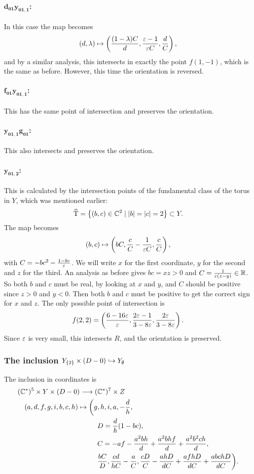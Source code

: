 \paragraph{$\mathbf{d_{01} y_{01,1}}$:}
In this case the map becomes
\[ (d,\lambda) \mapsto \left( \frac{(1-\lambda)C}{d},\frac{\varepsilon-1}{\varepsilon C},
  \frac{d}{C} \right), \]
and by a similar analysis, this intersects in exactly the
point $f(1,-1)$, which is the same as before. However, this time the
orientation is reversed.

\paragraph{$\mathbf{f_{01} y_{01,1}}$:}
This has the same point of intersection and preserves the orientation.

\paragraph{$\mathbf{y_{01,1}g_{01}}$:}
This also intersects and preserves the orientation.

\paragraph{$\mathbf{y_{01,2}}$:}
This is calculated by the intersection points of the fundamental class
of the torus in $Y$, which was mentioned earlier:
\[ \widehat {\operatorname{T}} = \left\{ (b,c) \in \mathbb{C}^2 \mid \left| b \right|=\left| c \right| = 2 \right\}
\subset Y. \]
The map becomes
\[ (b,c) \mapsto \left( bC, \frac{c}{C}-\frac{1}{\varepsilon C},\frac{c}{C}
\right), \]
with $C = -bc^2-\frac{1-bc}{\varepsilon}$. We will write $x$ for the first
coordinate, $y$ for the second and $z$ for the third. An analysis as
before gives $bc = xz > 0$ and $C = \frac{1}{\varepsilon(z-y)} \in
\mathbb{R}$. So both $b$ and $c$ must be real, by looking at $x$ and $y$, and
$C$ should be positive since $z>0$ and $y<0$. Then
both $b$ and $c$ must be positive to get the correct sign for $x$ and
$z$. The only possible point of intersection is
\[ f(2,2) = \left( \frac{6-16\varepsilon}{\varepsilon},
  \frac{2\varepsilon-1}{3-8\varepsilon},\frac{2\varepsilon}{3-8\varepsilon} \right). \]
Since $\varepsilon$ is very small, this intersects $R$, and the orientation is
preserved.

\subsubsection{The inclusion $Y_{\left\{ 2 \right\}}\times (D-0) 
  \hookrightarrow Y_\emptyset$}

The inclusion in coordinates is
\begin{align*}
  (\mathbb{C}^*)^5\times Y \times (D-0) \longrightarrow (&\mathbb{C}^*)^7\times Z \\
  (a,d,f,g,i,b,c,h) \mapsto 
  \bigg(g&,h,i,a,-\frac{d}{h},\\
  & D=\frac{d}{h}(1-bc), \\
  & C= -af-\frac{a^2bh}{d}+\frac{a^2bhf}{d}+\frac{a^2b^2ch}{d}, \\
  & \frac{bC}{D}, \frac{cd}{hC}-\frac{a}{C},
  \frac{cD}{C}-\frac{ahD}{dC}+\frac{afhD}{dC}+
  \frac{abchD}{dC}\bigg).
\end{align*}

